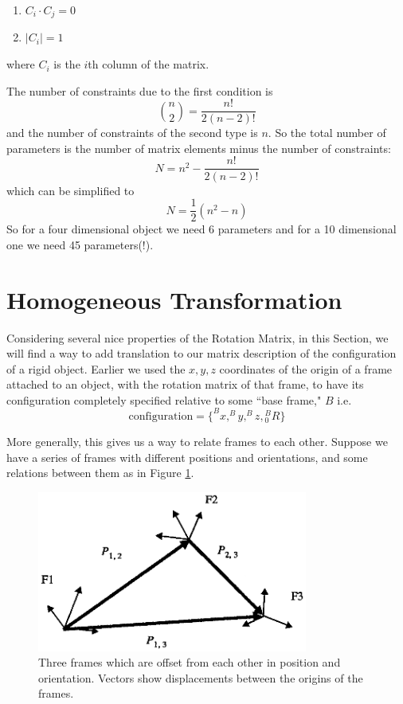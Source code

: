 \begin{enumerate}
  \item  $C_i \cdot C_j = 0$
  \item $|C_i| = 1$
\end{enumerate}
where $C_i$ is the $i$th column of the matrix.

The number of constraints due to the first condition is
\[
\binom{n}{2} = \frac{n!}{2(n-2)!}
\]
and the number of constraints of the second type is $n$.  So the total number of parameters is the number of matrix elements minus the number of constraints:
\[
N = n^2 - \frac{n!}{2(n-2)!}
\]
which can be simplified to
\[
N = \frac{1}{2} (n^2-n)
\]
So for a four dimensional object we need 6 parameters and for a 10 dimensional one we need 45 parameters(!).








\section{Homogeneous Transformation}
Considering several nice properties of the Rotation Matrix, in this Section, we will
find a  way to add translation to our matrix description of the configuration of a rigid object.
Earlier we used the $x,y,z$ coordinates of the origin of a frame attached to an object, with the rotation matrix of that frame,  to have its configuration completely specified  relative to some ``base frame," $B$ i.e.
\[
\mathrm{configuration} = \{^Bx,^By,^Bz, {}^B_0R\}
\]

More generally, this gives us a way to relate frames to each other.   Suppose we have a series of frames with different positions and orientations, and some relations between them as in Figure \ref{ThreeFramesVectors}.





\begin{figure}
\includegraphics[width=3.5in]{figs02/00332.eps}
\caption{Three frames which are offset from each other in position and orientation. Vectors show displacements between the origins of the frames.}\label{ThreeFramesVectors}
\end{figure}



